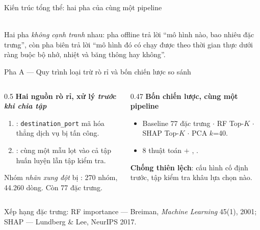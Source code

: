 \documentclass[aspectratio=169, 11pt]{beamer}
\begin{document}
\begin{frame}{Kiến trúc tổng thể: hai pha của cùng một pipeline}
{}
  \\[0.3em]
  \footnotesize
  Hai pha \emph{không cạnh tranh} nhau: pha offline trả lời ``mô hình nào, bao
  nhiêu đặc trưng'', còn pha biên trả lời ``mô hình đó có chạy được theo thời gian
  thực dưới ràng buộc bộ nhớ, nhiệt và băng thông hay không''.
\end{frame}

\begin{frame}{Pha A --- Quy trình loại trừ rò rỉ và bốn chiến lược so sánh}
  \begin{columns}[T]
    \begin{column}{0.5\textwidth}
      \textbf{Hai nguồn rò rỉ, xử lý \emph{trước khi chia tập}}
      \begin{enumerate}\small
        \item {}: \texttt{destination\_port} mã hóa
              thẳng dịch vụ bị tấn công.
        \item {}: cùng một mẫu lọt vào cả tập huấn
              luyện lẫn tập kiểm tra.
      \end{enumerate}
      \vspace{0.4em}
      \small Nhóm \emph{nhãn xung đột} bị : 270 nhóm,
      44.260 dòng. Còn 77 đặc trưng.
    \end{column}
    \begin{column}{0.47\textwidth}
      \textbf{Bốn chiến lược, cùng một pipeline}
      \begin{itemize}\small
        \item Baseline 77 đặc trưng $\cdot$ RF Top-$K$ $\cdot$ SHAP Top-$K$
              $\cdot$ PCA $k$=40.
        \item 8 thuật toán $+$ , .
      \end{itemize}
      \vspace{0.4em}
      \small \textbf{Chống thiên lệch}: cấu hình cố định trước, tập kiểm tra
       khâu lựa chọn nào.
    \end{column}
  \end{columns}
  \vspace{0.2em}
  {\tiny\textcolor{gray!55!black}{Xếp hạng đặc trưng: RF importance --- Breiman,
  \emph{Machine Learning} 45(1), 2001; SHAP --- Lundberg \& Lee, NeurIPS 2017.}}
\end{frame}
\end{document}
